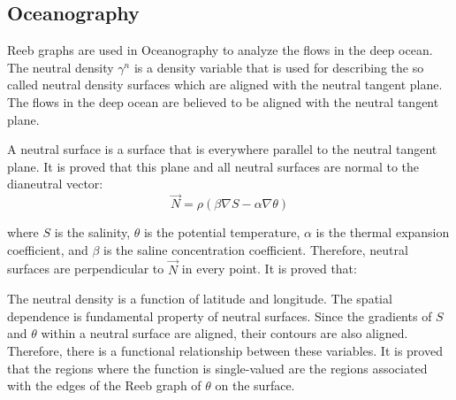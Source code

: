 \documentclass[]{article}
\begin{document}
\subsection{Oceanography}
    Reeb graphs are used in Oceanography to analyze the flows in the deep ocean. The neutral density $\gamma^n$ is a density variable that is used 
    for describing the so called neutral density surfaces which are aligned with the neutral tangent plane. The flows in the deep ocean are believed to be aligned with the neutral
    tangent plane.

    A neutral surface is a surface that is everywhere parallel to the neutral tangent plane. It is proved that this plane and all neutral surfaces are normal to
    the dianeutral vector:
   $$
    \vec{N}=\rho(\beta \nabla S-\alpha \nabla\theta)
   $$

   where $S$ is the salinity, $\theta$ is the potential temperature, $\alpha$ is the thermal expansion coefficient,
   and $\beta$ is the saline concentration coefficient. Therefore, neutral surfaces are perpendicular to $\vec{N}$ in every point. It is proved that:

   The neutral density is a function of latitude and longitude. The spatial dependence is fundamental property
   of neutral surfaces. Since the gradients of $S$ and $\theta$ within a neutral surface are aligned, their contours are also aligned.
   Therefore, there is a functional relationship between these variables. It is proved that the regions where
   the function is single-valued are the regions associated with the edges of the Reeb graph of $\theta$ on the surface.
\end{document}
